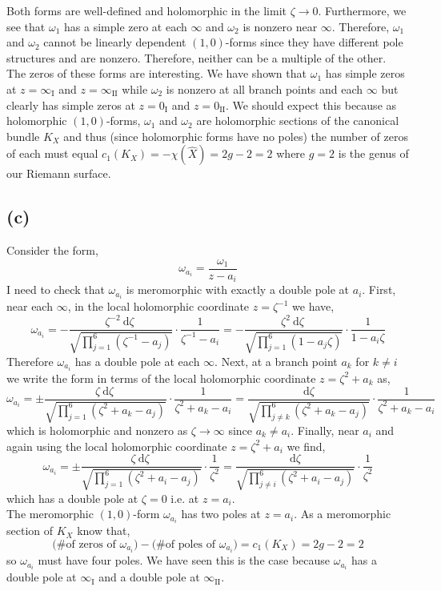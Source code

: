 \documentclass[12pt]{extarticle}
\renewcommand{\d}[1]{\: \mathrm{d}#1 \:}
\theoremstyle{definition}
\begin{document}
Both forms are well-defined and holomorphic in the limit $\zeta \to 0$. Furthermore, we see that $\omega_1$ has a simple zero at each $\infty$ and $\omega_2$ is nonzero near $\infty$. Therefore, $\omega_1$ and $\omega_2$ cannot be linearly dependent $(1,0)$-forms since they have different pole structures and are nonzero. Therefore, neither can be a multiple of the other. 
\bigskip\\
The zeros of these forms are interesting. We have shown that $\omega_1$ has simple zeros at $z = \infty_{\mathrm{I}}$ and $z = \infty_{\mathrm{II}}$ while $\omega_2$ is nonzero at all branch points and each $\infty$ but clearly has simple zeros at $z = 0_{\mathrm{I}}$ and $z = 0_{\mathrm{II}}$. We should expect this because as holomorphic $(1,0)$-forms, $\omega_1$ and $\omega_2$ are holomorphic sections of the canonical bundle $K_X$ and thus (since holomorphic forms have no poles) the number of zeros of each must equal $c_1(K_X) = - \chi(\hat{X}) = 2 g - 2 = 2$ where $g = 2$ is the genus of our Riemann surface.   

\subsection*{(c)}

Consider the form, 
\[ \omega_{a_i} =  \frac{\omega_1}{z - a_i} \]
I need to check that $\omega_{a_i}$ is meromorphic with exactly a double pole at $a_i$. First, near each $\infty$, in the local holomorphic coordinate $z = \zeta^{-1}$ we have,
\[ \omega_{a_i} = - \frac{\zeta^{-2} \d{\zeta}}{\sqrt{\prod_{j = 1}^6 (\zeta^{-1} - a_j)}} \cdot \frac{1}{\zeta^{-1} - a_i} = - \frac{\zeta^2 \d{\zeta}}{\sqrt{\prod_{j = 1}^6 (1 - a_j \zeta)}} \cdot \frac{1}{1 - a_i \zeta} \] 
Therefore $\omega_{a_i}$ has a double pole at each $\infty$. Next, at a branch point $a_k$ for $k \neq i$ we write the form in terms of the local holomorphic coordinate $z = \zeta^2 + a_k$ as,
\[ \omega_{a_i} = \pm \frac{\zeta \d{\zeta}}{\sqrt{\prod_{j = 1}^6 (\zeta^2 + a_k - a_j)}} \cdot \frac{1}{\zeta^2 + a_k - a_i} = \frac{\d{\zeta}}{\sqrt{\prod_{j \neq k}^6 (\zeta^2 + a_k - a_j)}} \cdot \frac{1}{\zeta^2 + a_k - a_i}\]
which is holomorphic and nonzero as $\zeta \to \infty$ since $a_k \neq a_i$. Finally, near $a_i$ and again using the local holomorphic coordinate $z = \zeta^2 + a_i$ we find,
\[ \omega_{a_i} = \pm \frac{\zeta \d{\zeta}}{\sqrt{\prod_{j = 1}^6 (\zeta^2 + a_i - a_j)}} \cdot \frac{1}{\zeta^2} = \frac{\d{\zeta}}{\sqrt{\prod_{j \neq i}^6 (\zeta^2 + a_i - a_j)}} \cdot \frac{1}{\zeta^2} \]
which has a double pole at $\zeta = 0$ i.e. at $z = a_i$. 
\bigskip\\
The meromorphic $(1,0)$-form $\omega_{a_i}$ has two poles at $z = a_i$. As a meromorphic section of $K_X$ know that,
\[ \text{(\# of zeros of $\omega_{a_i}$)} - \text{(\# of poles of $\omega_{a_i}$)} = c_1(K_X) = 2g - 2 = 2 \]
so $\omega_{a_i}$ must have four poles. We have seen this is the case because $\omega_{a_i}$ has a double pole at $\infty_{\mathrm{I}}$ and a double pole at $\infty_{\mathrm{II}}$. 
\end{document}
